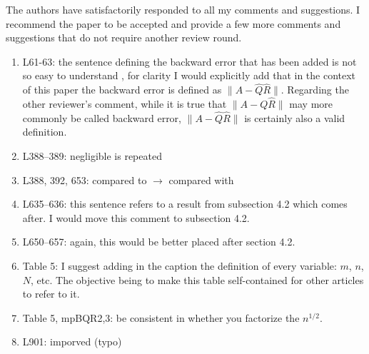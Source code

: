 \documentclass[final,onefignum,onetabnum]{siamart190516}
\begin{document}
The authors have satisfactorily responded to all my comments and suggestions. I
recommend the paper to be accepted and provide a few more comments and suggestions
that do not require another review round.
\begin{enumerate}
	\item L61-63: the sentence defining the backward error that has been added is not so easy to understand , for clarity I would explicitly add that in the context of this paper the backward error is defined as $\|A- \hat{Q}\hat{R}\|$. Regarding the other reviewer’s comment, while it is true that $\|A-Q\hat{R}\|$  may more commonly be called backward error, $\|A-\hat{Q}\hat{R}\|$ is certainly also a valid definition.
	\item L388–389: negligible is repeated
	\item L388, 392, 653: compared to $\rightarrow$ compared with
	\item L635–636: this sentence refers to a result from subsection 4.2 which comes after. I would move this comment to subsection 4.2.
	\item L650–657: again, this would be better placed after section 4.2.
	\item Table 5: I suggest adding in the caption the definition of every variable: $m$, $n$, $N$, etc. The objective being to make this table self-contained for other articles to refer to it.
	\item Table 5, mpBQR2,3: be consistent in whether you factorize the $n^{1/2}$.
	\item L901: imporved (typo)
\end{enumerate}



%
\end{document}
